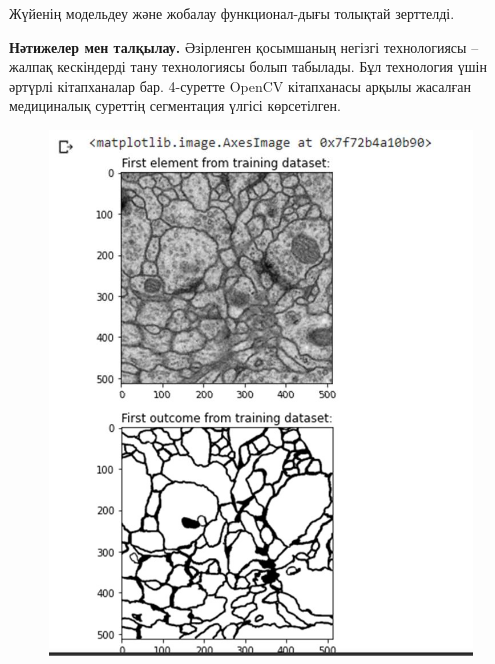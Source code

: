 \begin{multicols}{2}

Жүйенің модельдеу және жобалау функционал-дығы толықтай зерттелді.

{\bfseries Нәтижелер мен талқылау.} Әзірленген қосымшаның негізгі
технологиясы -- жалпақ кескіндерді тану технологиясы болып табылады. Бұл
технология үшін әртүрлі кітапханалар бар. 4-суретте OpenCV кітапханасы
арқылы жасалған медициналық суреттің сегментация үлгісі көрсетілген.
\end{multicols}

\begin{figure}[H]
  \centering
  \begin{minipage}{0.45\textwidth}
      \centering
      \includegraphics[width=1\textwidth]{assets/194}
      \caption*{}
  \end{minipage}
  \hfill
  \begin{minipage}{0.45\textwidth}
      \centering

\end{minipage}
\end{figure}
